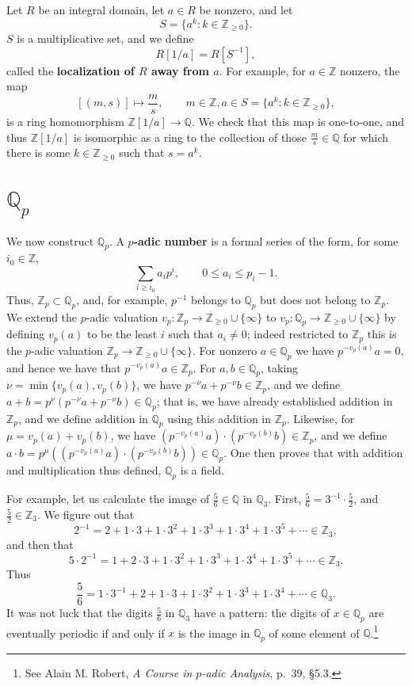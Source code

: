 \documentclass{article}
\theoremstyle{definition}
\begin{document}
Let $R$ be  an integral domain, let $a \in R$ be nonzero, and let
\[
S=\{a^k: k \in \mathbb{Z}_{\geq 0}\}.
\]
$S$ is a multiplicative set, and we define
\[
R[1/a] = R[S^{-1}],
\] 
called the \textbf{localization of $R$ away from $a$}. 
For example, for $a \in \mathbb{Z}$ nonzero, the map
\[
[(m,s)] \mapsto \frac{m}{s}, \qquad m \in \mathbb{Z}, a \in S=\{a^k: k \in \mathbb{Z}_{\geq 0}\},
\]
is a ring homomorphism $\mathbb{Z}[1/a] \to \mathbb{Q}$. We check that this map is one-to-one, and thus
$\mathbb{Z}[1/a]$ is isomorphic as a ring to the collection of those 
$\frac{m}{s} \in \mathbb{Q}$ for which there is some $k \in \mathbb{Z}_{\geq 0}$ such that $s=a^k$. 



\section{$\mathbb{Q}_p$}
We now construct $\mathbb{Q}_p$. A \textbf{$p$-adic number} is a formal series of the form, for some
$i_0 \in \mathbb{Z}$, 
\[
\sum_{i \geq i_0} a_i p^i, \qquad 0 \leq a_i  \leq p_i-1.
\]
Thus, $\mathbb{Z}_p \subset \mathbb{Q}_p$, and, for example, $p^{-1}$ belongs to $\mathbb{Q}_p$ but
does not belong to $\mathbb{Z}_p$. 
We extend the $p$-adic valuation $v_p:\mathbb{Z}_p \to \mathbb{Z}_{\geq 0} \cup \{\infty\}$
to $v_p:\mathbb{Q}_p \to \mathbb{Z}_{\geq 0} \cup \{\infty\}$ by defining $v_p(a)$ to be the least 
$i$ such that $a_i \neq 0$; indeed restricted to $\mathbb{Z}_p$ this is the $p$-adic valuation 
$\mathbb{Z}_p \to \mathbb{Z}_{\geq 0} \cup \{\infty\}$. For nonzero $a \in \mathbb{Q}_p$ we have 
$p^{-v_p(a)} a = 0$, and hence we have that $p^{-v_p(a)} a \in \mathbb{Z}_p$. For $a,b \in \mathbb{Q}_p$, taking
$\nu = \min\{v_p(a),v_p(b)\}$, we have $p^{-\nu}a+p^{-\nu}b \in \mathbb{Z}_p$, and we define
$a+b = p^{\nu} (p^{-\nu}a+p^{-\nu}b) \in \mathbb{Q}_p$; that is, we have already established addition in $\mathbb{Z}_p$, and we define
addition in $\mathbb{Q}_p$ using this addition in $\mathbb{Z}_p$. Likewise, for $\mu=v_p(a)+v_p(b)$, we have
$(p^{-v_p(a)}a)\cdot (p^{-v_p(b)}b) \in \mathbb{Z}_p$, and we define $a\cdot b = p^{\mu} ((p^{-v_p(a)}a)\cdot (p^{-v_p(b)}b)) \in 
\mathbb{Q}_p$. One then proves that with addition and multiplication thus defined, $\mathbb{Q}_p$ is a field.

For example, let us calculate the image of $\frac{5}{6} \in \mathbb{Q}$ in $\mathbb{Q}_3$. First, $\frac{5}{6}=3^{-1} \cdot \frac{5}{2}$,
and $\frac{5}{2} \in \mathbb{Z}_3$. We figure out that
\[
2^{-1}=2+1\cdot 3+1\cdot 3^2+1\cdot 3^3+1\cdot 3^4+1\cdot 3^5+\cdots \in \mathbb{Z}_3,
\]
and then that
\[
5\cdot 2^{-1} = 1+2\cdot 3+1\cdot 3^2+1\cdot 3^3+1\cdot 3^4+1\cdot 3^5+\cdots \in \mathbb{Z}_3.
\]
Thus
\[
\frac{5}{6} =  1\cdot 3^{-1} + 2 + 1\cdot 3 + 1\cdot 3^2+1\cdot 3^3+1\cdot 3^4+\cdots \in \mathbb{Q}_3.
\]
It was not luck that the digits
 $\frac{5}{6}$ in $\mathbb{Q}_3$ have a pattern: the digits of $x \in \mathbb{Q}_p$ are eventually
 periodic if and only if $x$ is the image in $\mathbb{Q}_p$ of some element of $\mathbb{Q}$.\footnote{See Alain M. Robert, {\em A Course in $p$-adic Analysis},
p.~39, \S 5.3.}
\end{document}
